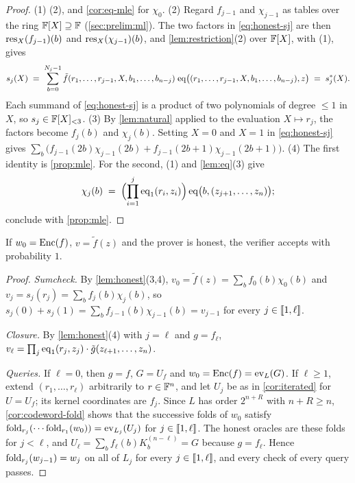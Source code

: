\begin{proof}
(1) (2), and \cref{cor:eq-mle} for $\chi_0$.
(2) Regard $f_{j-1}$ and $\chi_{j-1}$ as tables over the ring $\mathbb{F}[X] \supseteq \mathbb{F}$ (\cref{sec:prelim:ml}). The two factors in \eqref{eq:honest-sj} are then $\mathrm{res}_X(f_{j-1})(b)$ and $\mathrm{res}_X(\chi_{j-1})(b)$, and \cref{lem:restriction}(2) over $\mathbb{F}[X]$, with (1), gives
\[
  s_j(X) \;=\; \sum_{b=0}^{N_j-1} \tilde f(r_1,\dots,r_{j-1}, X, b_1,\dots,b_{n-j})\;\mathrm{eq}\bigl((r_1,\dots,r_{j-1},X,b_1,\dots,b_{n-j}),z\bigr) \;=\; s^*_j(X).
\]
Each summand of \eqref{eq:honest-sj} is a product of two polynomials of degree $\le 1$ in $X$, so $s_j \in \mathbb{F}[X]_{<3}$.
(3) By \cref{lem:natural} applied to the evaluation $X \mapsto r_j$, the factors become $f_j(b)$ and $\chi_j(b)$. Setting $X = 0$ and $X = 1$ in \eqref{eq:honest-sj} gives $\sum_b \bigl(f_{j-1}(2b)\chi_{j-1}(2b) + f_{j-1}(2b+1)\chi_{j-1}(2b+1)\bigr)$.
(4) The first identity is \cref{prop:mle}. For the second, (1) and \cref{lem:eq}(3) give
\[
  \chi_j(b) \;=\; \Bigl(\prod_{i=1}^{j}\mathrm{eq}_1(r_i,z_i)\Bigr)\,\mathrm{eq}\bigl(b,(z_{j+1},\dots,z_n)\bigr);
\]
conclude with \cref{prop:mle}.
\end{proof}

\begin{theorem}[Completeness]\label{thm:complete}
If $w_0 = \mathrm{Enc}(f)$, $v = \tilde f(z)$ and the prover is honest, the verifier accepts with probability $1$.
\end{theorem}

\begin{proof}
\emph{Sumcheck.} By \cref{lem:honest}(3,4), $v_0 = \tilde f(z) = \sum_b f_0(b)\chi_0(b)$ and $v_j = s_j(r_j) = \sum_b f_j(b)\chi_j(b)$, so $s_j(0) + s_j(1) = \sum_b f_{j-1}(b)\chi_{j-1}(b) = v_{j-1}$ for every $j \in \llbracket 1, \ell \rrbracket$.

\emph{Closure.} By \cref{lem:honest}(4) with $j = \ell$ and $g = f_\ell$, $v_\ell = \prod_{j}\mathrm{eq}_1(r_j,z_j) \cdot \tilde g(z_{\ell+1},\dots,z_n)$.

\emph{Queries.} If $\ell = 0$, then $g = f$, $G = U_f$ and $w_0 = \mathrm{Enc}(f) = \mathrm{ev}_L(G)$.
If $\ell \ge 1$, extend $(r_1,\dots,r_\ell)$ arbitrarily to $r \in \mathbb{F}^n$, and let $U_j$ be as in \cref{cor:iterated} for $U = U_f$; its kernel coordinates are $f_j$.
Since $L$ has order $2^{n+R}$ with $n+R \ge n$, \cref{cor:codeword-fold} shows that the successive folds of $w_0$ satisfy $\mathrm{fold}_{r_j}(\cdots\mathrm{fold}_{r_1}(w_0)) = \mathrm{ev}_{L_j}(U_j)$ for $j \in \llbracket 1, \ell \rrbracket$.
The honest oracles are these folds for $j < \ell$, and $U_\ell = \sum_b f_\ell(b) K^{(n-\ell)}_b = G$ because $g = f_\ell$.
Hence $\mathrm{fold}_{r_j}(w_{j-1}) = w_j$ on all of $L_j$ for every $j \in \llbracket 1, \ell \rrbracket$, and every check of every query passes.
\end{proof}

